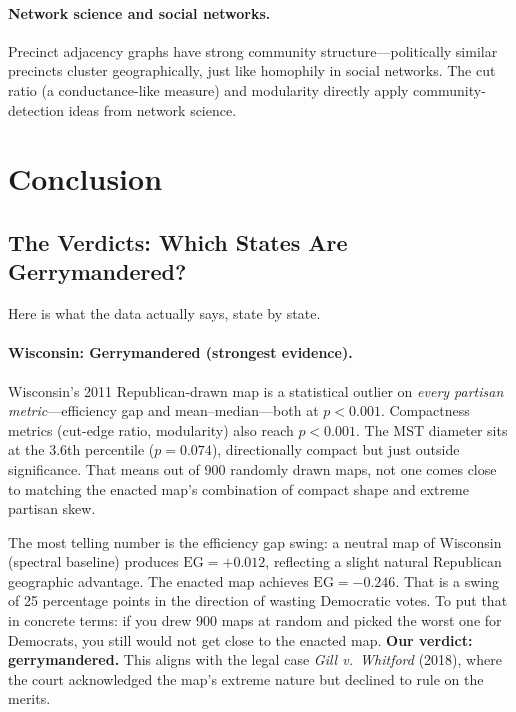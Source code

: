 \documentclass[11pt]{article}
\begin{document}
\paragraph{Network science and social networks.}
Precinct adjacency graphs have strong community structure---politically
similar precincts cluster geographically, just like homophily in social
networks. The cut ratio (a conductance-like measure) and modularity
directly apply community-detection ideas from network science.

\section{Conclusion}
\label{sec:conclusion}

\subsection*{The Verdicts: Which States Are Gerrymandered?}

Here is what the data actually says, state by state.

\paragraph{Wisconsin: Gerrymandered (strongest evidence).}
Wisconsin's 2011 Republican-drawn map is a statistical outlier on
\emph{every partisan metric}---efficiency gap and mean--median---both
at $p < 0.001$. Compactness metrics (cut-edge ratio, modularity) also
reach $p < 0.001$. The MST diameter sits at the 3.6th percentile
($p = 0.074$), directionally compact but just outside significance.
That means out of 900 randomly drawn maps, not one comes close to
matching the enacted map's combination of compact shape and extreme
partisan skew.

The most telling number is the efficiency gap swing: a neutral map of
Wisconsin (spectral baseline) produces $\mathrm{EG} = +0.012$, reflecting
a slight natural Republican geographic advantage. The enacted map
achieves $\mathrm{EG} = -0.246$. That is a swing of 25 percentage points
in the direction of wasting Democratic votes. To put that in concrete
terms: if you drew 900 maps at random and picked the worst one for
Democrats, you still would not get close to the enacted map. \textbf{Our
verdict: gerrymandered.} This aligns with the legal case
\textit{Gill v.\ Whitford} (2018), where the court acknowledged the
map's extreme nature but declined to rule on the merits.
\end{document}
